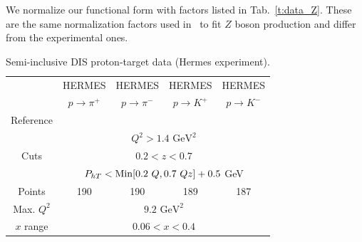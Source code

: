\documentclass[aps,preprintnumbers,showpacs,nofootinbib,superscriptaddress,floatfix]{revtex4}
\newcommand{\Tperp}{T}
\begin{document}
We normalize our functional form with factors listed in Tab.~\ref{t:data_Z}. These are the same normalization factors used in~\cite{DAlesio:2014mrz} to fit $Z$ boson production and differ from the experimental ones. 



\renewcommand{\tabcolsep}{0.4pc} %
\renewcommand{\arraystretch}{1.3} %

\begin{table}[h!]
\begin{center}
\begin{tabular}{|c|c|c|c|c|}
 \hline
  & HERMES & HERMES & HERMES & HERMES \\
 ~          &  $p \to \pi^+$    &   $p \to \pi^-$    &  $p \to K^+$    &   $p \to K^-$               \\
 \hline
 Reference & \multicolumn{4}{c|}{\cite{Airapetian:2012ki}}        \\
\hline
\multirow{3}{*}{Cuts}             & \multicolumn{4}{c|}{$Q^2 > 1.4 \text{ GeV}^2$}     \\
             & \multicolumn{4}{c|}{$0.2 <z <0.7$}     \\
             & \multicolumn{4}{c|}{$P_{h \Tperp}< {\rm Min}[0.2\ Q, 0.7 \ Q z ] +0.5$ GeV}     \\
\hline
 Points         &  190 & 190 & 189 & 187       \\
 \hline
Max. $Q^2$      &  \multicolumn{4}{c|}{$9.2 \text{ GeV}^2 $}               \\
 \hline
$x$ range       & \multicolumn{4}{c|}{$0.06 < x < 0.4$ }                \\
\hline
\end{tabular}
\caption{Semi-inclusive DIS proton-target data (Hermes experiment).}
\label{t:data_SIDIS_proton}
\end{center}
\end{table}
\end{document}

